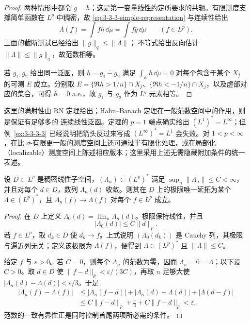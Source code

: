 \begin{proof}
两种情形中都令 $g=\overline h$；这是第一变量线性约定所要求的共轭。有限测度支撑简单函数在
$L^p$ 中稠密，故 \eqref{eq:3-3-3-simple-representation} 与连续性给出
\[
  \Lambda(f)=\int f h\,\dd\mu=\int f\overline g\,\dd\mu
  \qquad(f\in L^p).
\]
上面的截断测试已经给出 $\|g\|_q\le\|\Lambda\|$；\Holder{} 不等式给出反向估计
$\|\Lambda\|\le\|g\|_q$，故范数相等。

若 $g_1,g_2$ 给出同一泛函，则 $h=\overline{g_1-g_2}$ 满足
$\int_Eh\,\dd\mu=0$ 对每个包含于某个 $X_j$ 的可测 $E$ 成立。分别取
$E=\{\Re h>1/n\}\cap X_j$、$\{\Re h<-1/n\}\cap X_j$，以及虚部对应的集合，可得
$h=0$ a.e.，故 $g_1$ 与 $g_2$ 作为 $L^q$ 元素相等。
\end{proof}

这里的满射性由 RN 定理给出；Hahn--Banach 定理在一般范数空间中的作用，则是保证有足够多的
连续线性泛函。定理的 $p=1$ 端点确实给出 $(L^1)^*=L^\infty$；但
例~\ref{ex:3-3-3-3} 已经说明把箭头反过来写成 $(L^\infty)^*=L^1$ 会失败。对
$1<p<\infty$，在比 $\sigma$-有限更一般的测度空间上还可通过半有限化处理，或在局部化
（localizable）测度空间上陈述相应版本；这里采用上述无需隐藏附加条件的统一表述。

\begin{proposition}[稠密测试类上的收敛升级]\label{proposition:3-3-3-4}
设 $D\subset L^p$ 是稠密线性子空间，$(\Lambda_n)\subset(L^p)^*$ 满足
$\sup_n\|\Lambda_n\|\le C<\infty$，并且对每个 $d\in D$，数列
$\Lambda_n(d)$ 收敛。则其在 $D$ 上的极限唯一延拓为某个
$\Lambda\in(L^p)^*$，且
$\Lambda_n(f)\to\Lambda(f)$ 对每个 $f\in L^p$ 成立。
\end{proposition}

\begin{proof}
在 $D$ 上定义 $\Lambda_0(d)=\lim_n\Lambda_n(d)$。极限保持线性，并且
\[
 |\Lambda_0(d)|\le C\|d\|_p.
\]
若 $f\in L^p$，取 $d_k\in D$ 使 $d_k\to f$。上式说明
$(\Lambda_0(d_k))$ 是 Cauchy 列，其极限与逼近列无关；定义该极限为 $\Lambda(f)$，便得到
$\Lambda\in(L^p)^*$ 且 $\|\Lambda\|\le C$。

给定 $f$ 与 $\varepsilon>0$。若 $C=0$，则每个 $\Lambda_n$ 的范数为零，因而
$\Lambda_n=0=\Lambda$；以下设 $C>0$。取 $d\in D$ 使
$\|f-d\|_p<\varepsilon/(3C)$，再取 $n$ 足够大使
$|\Lambda_n(d)-\Lambda(d)|<\varepsilon/3$。于是
\[
 \begin{aligned}
 |\Lambda_n(f)-\Lambda(f)|
 &\le|\Lambda_n(f-d)|+|\Lambda_n(d)-\Lambda(d)|+|\Lambda(d-f)|\\
 &\le C\|f-d\|_p+\frac\varepsilon3+C\|f-d\|_p<\varepsilon.
 \end{aligned}
\]
范数的一致有界性正是同时控制首尾两项所必需的条件。
\end{proof}

